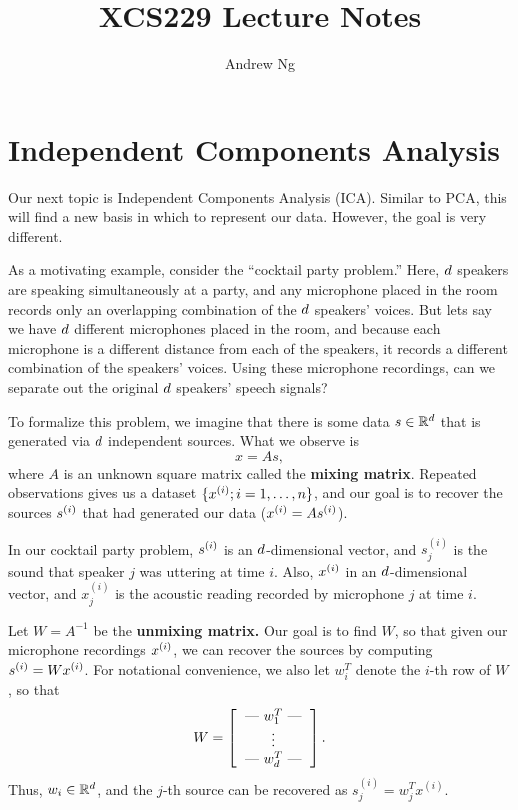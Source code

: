 \documentclass{article}
\begin{document}
\title{XCS229 Lecture Notes}
\author{Andrew Ng}
\date{}
\maketitle




\setcounter{part}{11}
\part{Independent Components Analysis}

Our next topic is Independent Components Analysis (ICA).  Similar to PCA, this
will find a new basis in which to represent our data.  However, the goal is very
different.

As a motivating example, consider the ``cocktail party problem.'' Here, ${d}$
speakers are speaking simultaneously at a party, and any microphone placed in the room
records only an overlapping combination of the ${d}$ speakers' voices.  But lets say we have ${d}$ different microphones
placed in the room, and because each microphone is a different distance from each
of the speakers, it records a different combination of the speakers' voices.  Using
these microphone recordings, can we separate out the original ${d}$ speakers' speech
signals?

To formalize this problem, we imagine that there is some data $s \in {\mathbb R}^{d}$ that is generated via
${d}$ independent sources.  What we observe is
\[
x = As,
\]
where $A$ is an unknown square matrix called the {\bf mixing matrix}.  Repeated observations
gives us a dataset
$\{{x^{(i)}}; i=1, \ldots, {n}\}$, and our goal is to recover the sources ${s^{(i)}}$ that had generated
our data (${x^{(i)}} = A {s^{(i)}}$).

In our cocktail party problem, ${s^{(i)}}$ is an ${d}$-dimensional vector, and $s_j^{(i)}$ is
the sound that speaker $j$ was uttering at time $i$.  Also, ${x^{(i)}}$ in an ${d}$-dimensional vector,
and $x_j^{(i)}$ is the acoustic reading recorded by microphone $j$ at time $i$.

Let $W = A^{-1}$ be the {\bf unmixing matrix.} Our goal is to find $W$, so that given
our microphone recordings ${x^{(i)}}$,
we can recover the sources by computing ${s^{(i)}} = W{x^{(i)}}$.  For notational convenience, we also
let $w_i^T$ denote the $i$-th row of $W$, so that
\[
W = \left[ \begin{tabular}{c} --- $w_1^T$ --- \\ \vdots \\ --- $w_{\di}^T$ --- \end{tabular} \right].
\]
Thus, $w_i \in {\mathbb R}^{d}$, and the $j$-th source can be recovered as $s^{(i)}_j = w_j^T x^{(i)}$.
\end{document}

